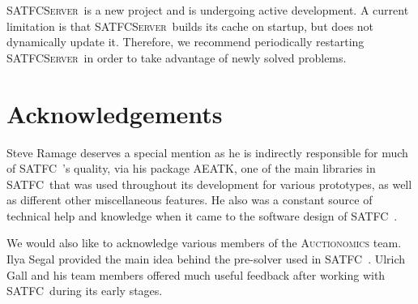 \documentclass[
10pt, %
letterpaper, %
oneside, %
headinclude,footinclude, %
BCOR5mm, %
needspace, %
]{scrartcl}
\newcommand{\SATFC}{\textsc{SATFC}~}
\newcommand{\SATFCServer}{\textsc{SATFCServer}~}
\newcommand{\AEATK}{\textsc{AEATK}}
\begin{document}
\begin{fwarning}
	\SATFCServer is a new project and is undergoing active development. A current limitation is that \SATFCServer builds its cache on startup, but does not dynamically update it. Therefore, we recommend periodically restarting \SATFCServer in order to take advantage of newly solved problems.
\end{fwarning}


\section{Acknowledgements} 

Steve Ramage deserves a special mention as he is indirectly responsible for much of \SATFC's quality, via his package \AEATK, one of the main libraries in \SATFC that was used throughout its development for various prototypes, as well as different other miscellaneous features. He also was a constant source of technical help and knowledge when it came to the software design of \SATFC.

We would also like to acknowledge various members of the \textsc{Auctionomics} team. Ilya Segal provided the main idea behind the pre-solver used in \SATFC. Ulrich Gall and his team members offered much useful feedback after working with \SATFC during its early stages.
\end{document}
